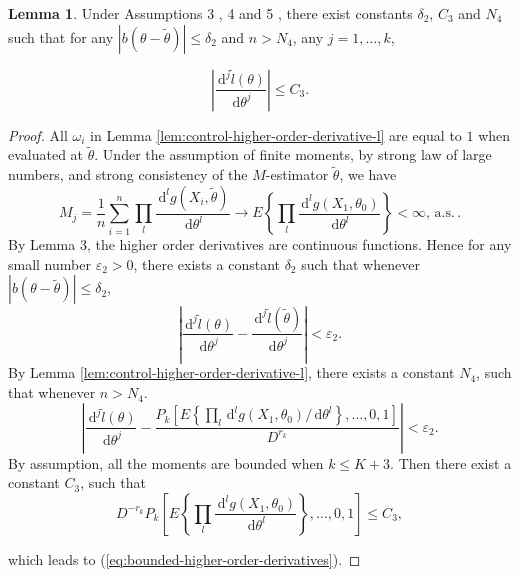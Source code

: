 \documentclass[oneside,english]{amsbook}
\numberwithin{section}{chapter}
\numberwithin{equation}{section}
\numberwithin{figure}{section}
\theoremstyle{plain}
\theoremstyle{plain}
\theoremstyle{definition}
\theoremstyle{plain}
\theoremstyle{plain}
\theoremstyle{remark}
\theoremstyle{definition}
\newtheorem{lemma}{Lemma}
\theoremstyle{definition}
\newcommand{\diff}{\,\mathrm{d}}
\newcommand{\ascv}{\,\mathrm{a.s.}\,}
\begin{document}
\begin{lemma}
\label{lem:bounded-high-order-der} Under Assumptions 3 , 4 and 5 ,
there exist constants $\delta_{2}$, $C_{3}$ and $N_{4}$ such that
for any $\left|b\left(\theta-\tilde{\theta}\right)\right|\le\delta_{2}$
and $n>N_{4}$, any $j=1,\ldots,k$,%

{} 
\begin{equation}
\left|\frac{\diff^{j}\tilde{l}\left(\theta\right)}{\diff\theta^{j}}\right|\le C_{3}.\label{eq:bounded-higher-order-derivatives}
\end{equation}
\end{lemma}
\begin{proof}
All $\omega_{i}$ in Lemma \ref{lem:control-higher-order-derivative-l}
are equal to $1$ when evaluated at $\tilde{\theta}$. Under the assumption
of finite moments, by strong law of large numbers, and strong consistency
of the $M$-estimator $\tilde{\theta}$, we have 
\[
M_{j}=\frac{1}{n}\sum_{i=1}^{n}\prod_{l}\frac{\diff^{l}g\left(X_{i},\tilde{\theta}\right)}{\diff\theta^{l}}\rightarrow E\left\{ \prod_{l}\frac{\diff^{l}g\left(X_{1},\theta_{0}\right)}{\diff\theta^{l}}\right\} <\infty,\ascv.
\]
 By Lemma 3, the higher order
derivatives are continuous functions. Hence for any small number $\varepsilon_{2}>0$,
there exists a constant $\delta_{2}$ such that whenever $\left|b\left(\theta-\tilde{\theta}\right)\right|\le\delta_{2}$,
\[
\left|\frac{\diff^{j}\tilde{l}\left(\theta\right)}{\diff\theta^{j}}-\frac{\diff^{j}\tilde{l}\left(\tilde{\theta}\right)}{\diff\theta^{j}}\right|<\varepsilon_{2}.
\]
By Lemma \ref{lem:control-higher-order-derivative-l}, there exists
a constant $N_{4}$, such that whenever $n>N_{4}$. 
\[
\left|\frac{\diff^{j}\tilde{l}\left(\theta\right)}{\diff\theta^{j}}-\frac{P_{k}\left[E\left\{ \prod_{l}\diff^{l}g\left(X_{1},\theta_{0}\right)/\diff\theta^{l}\right\} ,\ldots,0,1\right]}{D^{r_{k}}}\right|<\varepsilon_{2}.
\]
By assumption, all the moments are bounded when $k\le K+3$.
Then there exist a constant $C_{3}$, such that 
\[
D^{-r_{k}}P_{k}\left[E\left\{ \prod_{l}\frac{\diff^{l}g\left(X_{1},\theta_{0}\right)}{\diff\theta^{l}}\right\} ,\ldots,0,1\right]\le C_{3},
\]

 which leads to (\ref{eq:bounded-higher-order-derivatives}). 
\end{proof}
\end{document}
